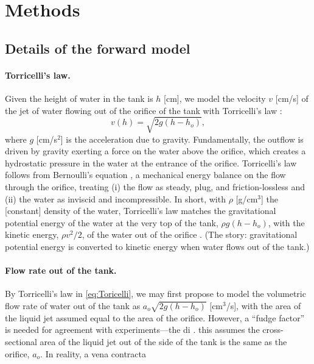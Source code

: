 \documentclass[openacc]{rsproca_new}%
\begin{document}
\section{Methods}

\subsection{Details of the forward model}
\paragraph{Torricelli's law.} Given the height of water in the tank is $h$ [cm], we model the velocity $v$ [cm/s] of the jet of water flowing out of the orifice of the tank with Torricelli's law \cite{d2021torricelli}:
\begin{equation}
	v(h)=  \sqrt{2 g(h-h_o)}, \label{eq:Toricelli}
\end{equation} where $g$ [cm/s$^2$] is the acceleration due to gravity. 
Fundamentally, the outflow is driven by gravity exerting a force on the water above the orifice, which creates a hydrostatic pressure in the water at the entrance of the orifice. 
Torricelli's law follows from Bernoulli's equation \cite{welty2020fundamentals}, a mechanical energy balance on the flow through the orifice, treating (i) the flow as steady, plug, and friction-lossless and (ii) the water as inviscid and incompressible.
In short, with $\rho$ [g/cm$^3$] the [constant] density of the water, Torricelli's law matches the gravitational potential energy of the water at the very top of the tank, $\rho g(h-h_o)$, with the kinetic energy, $\rho v^2/2$, of the water out of the orifice \cite{groetsch1993inverse}. (The story: gravitational potential energy is converted to kinetic energy when water flows out of the tank.)

\paragraph{Flow rate out of the tank.}
By Torricelli's law in \ref{eq:Toricelli}, we may first propose to model the volumetric flow rate of water out of the tank as $a_o\sqrt{2 g(h-h_o)}$ [cm$^3$/s], with the area of the liquid jet assumed equal to the area of the orifice. 
However, a ``fudge factor'' is needed for agreement with experiments---the di \cite{lienhard1984velocity}.
 this assumes the cross-sectional area of the liquid jet out of the side of the tank is the same as the orifice, $a_o$. In reality, a vena contracta 
\end{document}
